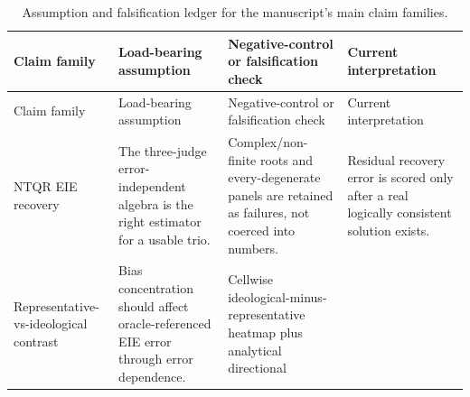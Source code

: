\documentclass[
]{article}
\begin{document}
\begin{longtable}[]{@{}
  >{\raggedright\arraybackslash}p{}
  >{\raggedright\arraybackslash}p{}
  >{\raggedright\arraybackslash}p{}
  >{\raggedright\arraybackslash}p{}@{}}
\caption{Assumption and falsification ledger for the manuscript's main
claim families.}\label{tbl:falsification}\tabularnewline
\toprule\noalign{}
\begin{minipage}[b]{\linewidth}\raggedright
Claim family
\end{minipage} & \begin{minipage}[b]{\linewidth}\raggedright
Load-bearing assumption
\end{minipage} & \begin{minipage}[b]{\linewidth}\raggedright
Negative-control or falsification check
\end{minipage} & \begin{minipage}[b]{\linewidth}\raggedright
Current interpretation
\end{minipage} \\
\midrule\noalign{}
\endfirsthead
\toprule\noalign{}
\begin{minipage}[b]{\linewidth}\raggedright
Claim family
\end{minipage} & \begin{minipage}[b]{\linewidth}\raggedright
Load-bearing assumption
\end{minipage} & \begin{minipage}[b]{\linewidth}\raggedright
Negative-control or falsification check
\end{minipage} & \begin{minipage}[b]{\linewidth}\raggedright
Current interpretation
\end{minipage} \\
\midrule\noalign{}
\endhead
\bottomrule\noalign{}
\endlastfoot
NTQR EIE recovery & The three-judge error-independent algebra is the
right estimator for a usable trio. & Complex/non-finite roots and
every-degenerate panels are retained as failures, not coerced into
numbers. & Residual recovery error is scored only after a real logically
consistent solution exists. \\
Representative-vs-ideological contrast & Bias concentration should
affect oracle-referenced EIE error through error dependence. & Cellwise
ideological-minus-representative heatmap plus analytical directional

\end{longtable}
\end{document}

